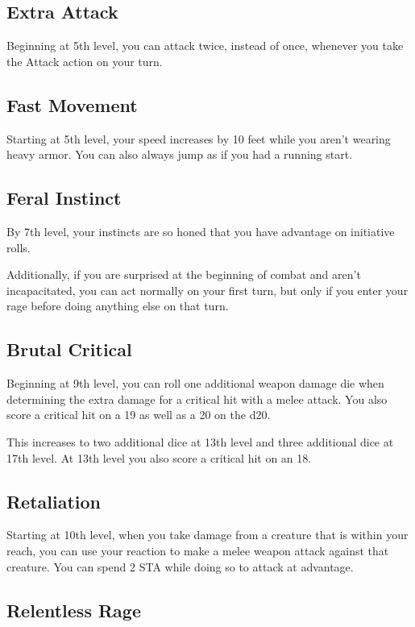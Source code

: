 \subsection{Extra Attack}

Beginning at 5th level, you can attack twice, instead of once, whenever you take the Attack action on your turn.

\subsection{Fast Movement}

Starting at 5th level, your speed increases by 10 feet while you aren't wearing heavy armor. You can also always jump as if you had a running start.

\subsection{Feral Instinct}

By 7th level, your instincts are so honed that you have advantage on initiative rolls.

Additionally, if you are surprised at the beginning of combat and aren't incapacitated, you can act normally on your first turn, but only if you enter your rage before doing anything else on that turn.

\subsection{Brutal Critical}

Beginning at 9th level, you can roll one additional weapon damage die when determining the extra damage for a critical hit with a melee attack. You also score a critical hit on a 19 as well as a 20 on the d20.

This increases to two additional dice at 13th level and three additional dice at 17th level. At 13th level you also score a critical hit on an 18.

\subsection{Retaliation}
Starting at 10th level, when you take damage from a creature that is within your reach, you can use your reaction to make a melee weapon attack against that creature. You can spend 2 STA while doing so to attack at advantage.

\subsection{Relentless Rage}

